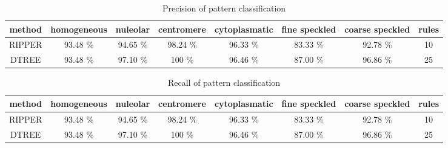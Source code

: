\begin{table}
	\caption{Precision of pattern classification}
	\label{tab:Precision}
	\tiny
	\centering
	\begin{tabular}{|c|c|c|c|c|c|c|c|}
		\textbf{method} & homogeneous & nuleolar & centromere & cytoplasmatic & fine speckled & coarse speckled & rules \\
		\hline
		\hline
		RIPPER & 93.48 \% & 94.65 \% & 98.24 \% & 96.33 \% & 83.33 \% & 92.78 \% & 10 \\
		\hline	
		DTREE & 93.48 \% & 97.10 \% & 100 \% & 96.46 \% & 87.00 \% & 96.86 \% & 25 \\	
	\end{tabular}
\end{table}

\begin{table}
	\caption{Recall of pattern classification}
	\label{tab:Recall}
	\tiny
	\centering
	\begin{tabular}{|c|c|c|c|c|c|c|c|}
		\textbf{method} & homogeneous & nuleolar & centromere & cytoplasmatic & fine speckled & coarse speckled & rules \\
		\hline
		\hline
		RIPPER & 93.48 \% & 94.65 \% & 98.24 \% & 96.33 \% & 83.33 \% & 92.78 \% & 10 \\
		\hline	
		DTREE & 93.48 \% & 97.10 \% & 100 \% & 96.46 \% & 87.00 \% & 96.86 \% & 25 \\	
	\end{tabular}
\end{table}




